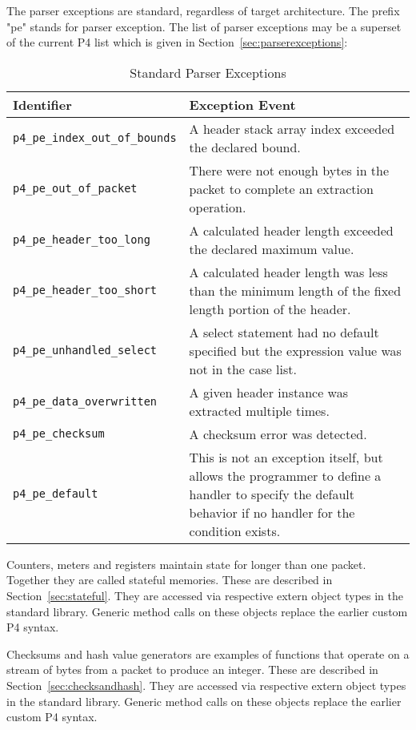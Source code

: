 The parser exceptions are standard, regardless of target architecture.
The prefix "pe" stands for parser exception.  The list of parser
exceptions may be a superset of the current P4 list which
is given in Section~\ref{sec:parserexceptions}:

\begin{table}[H]
\begin{center}
\begin{tabular}{| l | p{} |} \hline
\textbf{Identifier} &
\textbf{Exception Event} \\ \hline
\texttt{p4_pe_index_out_of_bounds} &
A header stack array index exceeded the declared bound. \\ \hline
\texttt{p4_pe_out_of_packet} &
There were not enough bytes in the packet to complete an extraction operation. \\ \hline
\texttt{p4_pe_header_too_long} &
A calculated header length exceeded the declared maximum value. \\ \hline
\texttt{p4_pe_header_too_short} &
A calculated header length was less than the minimum length of the fixed length 
portion of the header. \\ \hline
\texttt{p4_pe_unhandled_select} &
A select statement had no default specified but the expression value was not 
in the case list. \\ \hline
\texttt{p4_pe_data_overwritten} &
A given header instance was extracted multiple times. \\ \hline
\texttt{p4_pe_checksum} &
A checksum error was detected. \\ \hline
\texttt{p4_pe_default} &
This is not an exception itself, but allows the programmer to define a handler 
to specify the default behavior if no handler for the condition exists. \\
\hline
\end{tabular}
\end{center}
\caption{Standard Parser Exceptions}
\label{tab:parserexceptions}
\end{table}


Counters, meters and registers maintain state for longer than one packet. 
Together they are called stateful memories.  These are described in
Section~\ref{sec:stateful}.  They are accessed via respective extern
object types in the standard library.  Generic method calls on these objects
replace the earlier custom P4 syntax.


Checksums and hash value generators are examples of functions that operate on a
stream of bytes from a packet to produce an integer.  These are described
in Section~\ref{sec:checksandhash}.   They are accessed via respective extern
object types in the standard library.  Generic method calls on these objects
replace the earlier custom P4 syntax.


